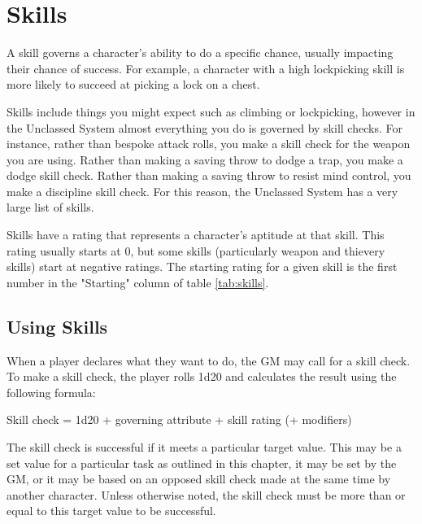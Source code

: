 \chapter{Skills}\label{skills}





\begin{multicols}{2}
    A skill governs a character's ability to do a specific chance, usually
    impacting their chance of success. For example, a character with a high
    lockpicking skill is more likely to succeed at picking a lock on a chest.

    Skills include things you might expect such as climbing or lockpicking,
    however in the Unclassed System almost everything you do is governed by
    skill checks. For instance, rather than bespoke attack rolls, you make
    a skill check for the weapon you are using. Rather than making a saving
    throw to dodge a trap, you make a dodge skill check. Rather than making
    a saving throw to resist mind control, you make a discipline skill check.
    For this reason, the Unclassed System has a very large list of skills.

    Skills have a rating that represents a character's aptitude at that skill.
    This rating usually starts at 0, but some skills (particularly weapon
    and thievery skills) start at negative ratings. The starting rating for
    a given skill is the first number in the "Starting" column of table
    \ref{tab:skills}.

    \section{Using Skills}
    When a player declares what they want to do, the GM may call for a skill
    check. To make a skill check, the player rolls 1d20 and calculates the
    result using the following formula:

    \begin{center}
        Skill check = 1d20 + governing attribute + skill rating (+ modifiers)
    \end{center}

    The skill check is successful if it meets a particular target value. This
    may be a set value for a particular task as outlined in this chapter, it
    may be set by the GM, or it may be based on an opposed skill check made at
    the same time by another character. Unless otherwise noted, the skill
    check must be more than or equal to this target value to be successful.


\end{multicols}
